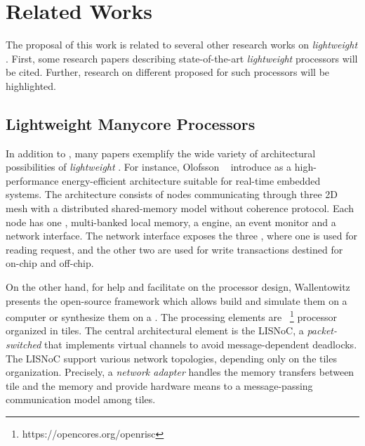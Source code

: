 \chapter{Related Works}
\label{ch.related-works}

The proposal of this work is related to several other research works
on \textit{lightweight} \manycores.
First, some research papers describing state-of-the-art \textit{lightweight} \manycores
processors will be cited. Further, research on different \oses
proposed for such processors will be highlighted.

\section{Lightweight Manycore Processors}
\label{sec.works.manycores}


	In addition to \mppa, many papers exemplify the wide variety of architectural
	possibilities of \textit{lightweight} \manycores.
	For instance, Olofsson \etal~\cite{olofsson2014} introduce \epiphany as a
	high-performance energy-efficient \manycore architecture suitable for
	real-time embedded systems.
	The architecture consists of nodes communicating through three 2D mesh \nocs
	with a distributed shared-memory model without coherence protocol.
	Each node has one \risc \cpu, multi-banked local memory, a \dma engine,
	an event monitor and a network interface.
	The network interface exposes the three \nocs, where one is used for reading
	request, and the other two are used for write transactions destined for on-chip
	and off-chip.

	On the other hand, for help and facilitate on the \manycore processor design,
	Wallentowitz \etal~\cite{Wallentowitz2013} presents the open-source framework
	\optimsoc which allows build \manycore \soc and simulate them on a computer or
	synthesize them on a \fpga.
	The processing elements are \openrisc~\footnote{https://opencores.org/openrisc}
	processor organized in tiles.
	The central architectural element is the LISNoC, a \textit{packet-switched \noc}
	that implements virtual channels to avoid message-dependent deadlocks.
	The LISNoC support various network topologies, depending only on the tiles organization.
	Precisely, a \textit{network adapter} handles the memory transfers between
	tile and the memory and provide hardware means to a message-passing communication
	model among tiles.

